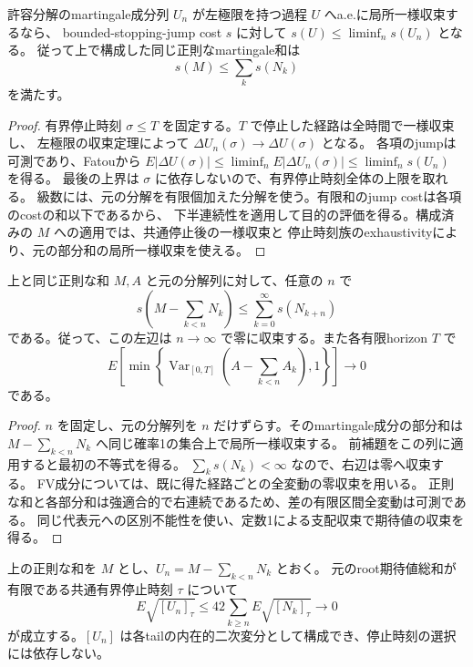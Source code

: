 \begin{lemma}[級数極限の停止jump評価]
許容分解のmartingale成分列 $U_n$ が左極限を持つ過程 $U$ へa.e.に局所一様収束するなら、
bounded-stopping-jump cost $s$ に対して $s(U)\le\liminf_n s(U_n)$ となる。
従って上で構成した同じ正則なmartingale和は
\[
 s(M)\le\sum_k s(N_k)
\]
を満たす。
\end{lemma}
\begin{proof}
有界停止時刻 $\sigma\le T$ を固定する。$T$ で停止した経路は全時間で一様収束し、
左極限の収束定理によって $\Delta U_n(\sigma)\to\Delta U(\sigma)$ となる。
各項のjumpは可測であり、Fatouから
$E|\Delta U(\sigma)|\le\liminf_n E|\Delta U_n(\sigma)|\le\liminf_n s(U_n)$ を得る。
最後の上界は $\sigma$ に依存しないので、有界停止時刻全体の上限を取れる。
級数には、元の分解を有限個加えた分解を使う。有限和のjump costは各項のcostの和以下であるから、
下半連続性を適用して目的の評価を得る。構成済みの $M$ への適用では、共通停止後の一様収束と
停止時刻族のexhaustivityにより、元の部分和の局所一様収束を使える。
\end{proof}
\begin{lemma}[成分級数のtail評価]
上と同じ正則な和 $M,A$ と元の分解列に対して、任意の $n$ で
\[
 s\left(M-\sum_{k<n}N_k\right)\le\sum_{k=0}^{\infty}s(N_{k+n})
\]
である。従って、この左辺は $n\to\infty$ で零に収束する。また各有限horizon $T$ で
\[
 E\left[\min\left\{\operatorname{Var}_{[0,T]}
       \left(A-\sum_{k<n}A_k\right),1\right\}\right]\longrightarrow0
\]
である。
\end{lemma}
\begin{proof}
$n$ を固定し、元の分解列を $n$ だけずらす。そのmartingale成分の部分和は
$M-\sum_{k<n}N_k$ へ同じ確率1の集合上で局所一様収束する。
前補題をこの列に適用すると最初の不等式を得る。
$\sum_k s(N_k)<\infty$ なので、右辺は零へ収束する。
FV成分については、既に得た経路ごとの全変動の零収束を用いる。
正則な和と各部分和は強適合的で右連続であるため、差の有限区間全変動は可測である。
同じ代表元への区別不能性を使い、定数1による支配収束で期待値の収束を得る。
\end{proof}
\begin{lemma}
上の正則な和を $M$ とし、$U_n=M-\sum_{k<n}N_k$ とおく。
元のroot期待値総和が有限である共通有界停止時刻 $\tau$ について
\[
 E\sqrt{[U_n]_\tau}
 \le42\sum_{k\ge n}E\sqrt{[N_k]_\tau}\longrightarrow0
\]
が成立する。$[U_n]$ は各tailの内在的二次変分として構成でき、停止時刻の選択には依存しない。
\end{lemma}
